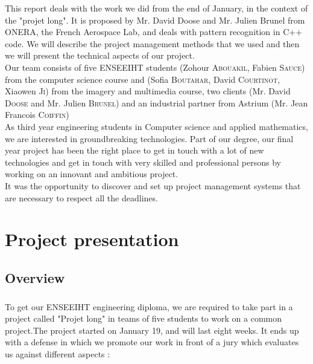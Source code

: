 \documentclass{report}
\begin{document}
\hspace*{1cm}This report deals with the work we did from the end of 
January, in the context of the "projet long". It is proposed by Mr. David
Doose and Mr. Julien Brunel from ONERA, the French Aerospace Lab, 
and deals with pattern recognition in C++ code. We will describe the project management methods 
that we used and then we will present the technical aspects of our project.\\
\hspace*{1cm} Our team consists
 of five ENSEEIHT students (Zohour \textsc{Abouakil}, Fabien \textsc{Sauce})
from the computer science course and (Sofia \textsc{Boutahar}, David \textsc{Courtinot},
Xiaowen \textsc{Ji}) from the imagery and multimedia course, two clients (Mr. David \textsc{Doose} and Mr. Julien \textsc{Brunel})
and an industrial partner from Astrium (Mr. Jean Francois \textsc{Coiffin}) \\
\hspace*{1cm}As third year engineering students in Computer science and applied mathematics, we are interested in groundbreaking technologies. Part of our degree, our final year project has been the right place
 to get in touch with a lot of new technologies and get in touch with 
very skilled and professional persons by working on an
  innovant and ambitious project.\\
\hspace*{1cm} It was the opportunity to discover and set up
 project management systems that are necessary to respect
all the deadlines.
\chapter{Project presentation}

\section{Overview}

\paragraph{}
\hspace{4mm}\textnormal{To get our ENSEEIHT engineering diploma, we are required to 
take part in a project called "Projet long" in teams of five students 
to work on a common project.The project started on January 19, 
and will last eight weeks. It ends up with a defense in which we
 promote our work in front of a jury which evaluates us against 
different aspects :
}
\end{document}
